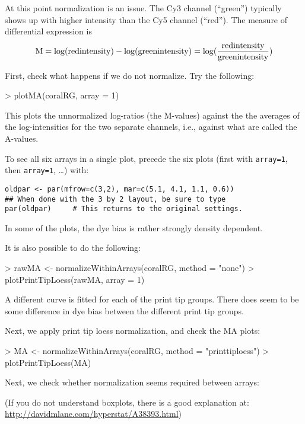 \documentclass[a4paper,9pt]{article}
\begin{document}
At this point normalization is an issue.  The Cy3 channel (``green'')
typically shows up with higher intensity than the Cy5 channel
(``red'').  The measure of differential expression is\[ 
{\rm M} = \log({\rm red intensity}) - \log({\rm green intensity}) =
\log(\frac{\displaystyle \rm red intensity}
{\displaystyle \rm green intensity})
\]

First, check what happens if we do not normalize.
Try the following:
\begin{Schunk}
\begin{Sinput}
> plotMA(coralRG, array = 1)
\end{Sinput}
\end{Schunk}
This plots the unnormalized log-ratios (the M-values) against the
the averages of the log-intensities for the two separate channels,
i.e., against what are called the A-values.

To see all six arrays in a single plot, precede the six plots
(first with \texttt{array=1}, then \texttt{array=1}, \ldots)
with:
\begin{verbatim}
oldpar <- par(mfrow=c(3,2), mar=c(5.1, 4.1, 1.1, 0.6))
## When done with the 3 by 2 layout, be sure to type
par(oldpar)     # This returns to the original settings.
\end{verbatim}
In some of the plots, the dye bias is rather strongly density dependent.

It is also possible to do the following:
\begin{Schunk}
\begin{Sinput}
> rawMA <- normalizeWithinArrays(coralRG, method = "none")
> plotPrintTipLoess(rawMA, array = 1)
\end{Sinput}
\end{Schunk}
A different curve is fitted for each of the print tip groups.
There does seem to be some difference in dye bias between the
different print tip groups.

Next, we apply print tip loess normalization, and check the MA plots:
\begin{Schunk}
\begin{Sinput}
> MA <- normalizeWithinArrays(coralRG, method = "printtiploess")
> plotPrintTipLoess(MA)
\end{Sinput}
\end{Schunk}
Next, we check whether normalization seems required between arrays:
\begin{Schunk}
\end{Schunk}
(If you do not understand boxplots, there is a good explanation at:
\url{http://davidmlane.com/hyperstat/A38393.html})
\end{document}
